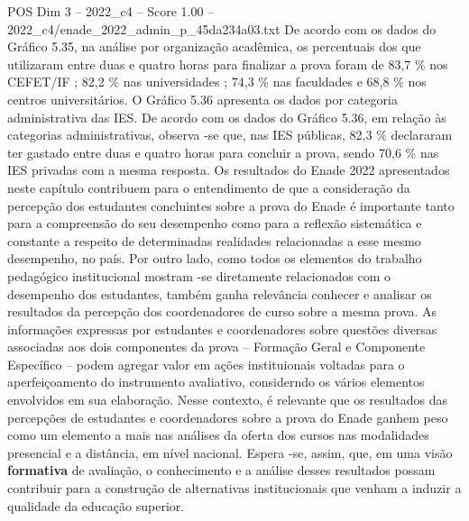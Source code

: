 \begin{textsample}{POS Dim 3 – 2022\_c4 – Score 1.00 – 2022\_c4/enade\_2022\_admin\_p\_45da234a03.txt}
De acordo com os dados do Gráfico 5.35, na análise por organização acadêmica, os percentuais dos que utilizaram entre duas e quatro horas para finalizar a prova foram de 83,7 \% nos CEFET/IF ; 82,2 \% nas universidades ; 74,3 \% nas faculdades e 68,8 \% nos centros universitários.
O Gráfico 5.36 apresenta os dados por categoria administrativa das IES.
De acordo com os dados do Gráfico 5.36, em relação às categorias administrativas, observa -se que, nas IES públicas, 82,3 \% declararam ter gastado entre duas e quatro horas para concluir a prova, sendo 70,6 \% nas IES privadas com a mesma resposta.
Os resultados do Enade 2022 apresentados neste capítulo contribuem para o entendimento de que a consideração da percepção dos estudantes concluintes sobre a prova do Enade é importante tanto para a compreensão do seu desempenho como para a reflexão sistemática e constante a respeito de determinadas realidades relacionadas a esse mesmo desempenho, no país.
Por outro lado, como todos os elementos do trabalho pedagógico institucional mostram -se diretamente relacionados com o desempenho dos estudantes, também ganha relevância conhecer e analisar os resultados da percepção dos coordenadores de curso sobre a mesma prova.
As informações expressas por estudantes e coordenadores sobre questões diversas associadas aos dois componentes da prova – Formação Geral e Componente Específico – podem agregar valor em ações instituionais voltadas para o aperfeiçoamento do instrumento avaliativo, considerndo os vários elementos envolvidos em sua elaboração.
Nesse contexto, é relevante que os resultados das percepções de estudantes e coordenadores sobre a prova do Enade ganhem peso como um elemento a mais nas análises da oferta dos cursos nas modalidades presencial e a distância, em nível nacional.
Espera -se, assim, que, em uma visão \textbf{formativa} de avaliação, o conhecimento e a análise desses resultados possam contribuir para a construção de alternativas institucionais que venham a induzir a qualidade da educação superior.

\end{textsample}
